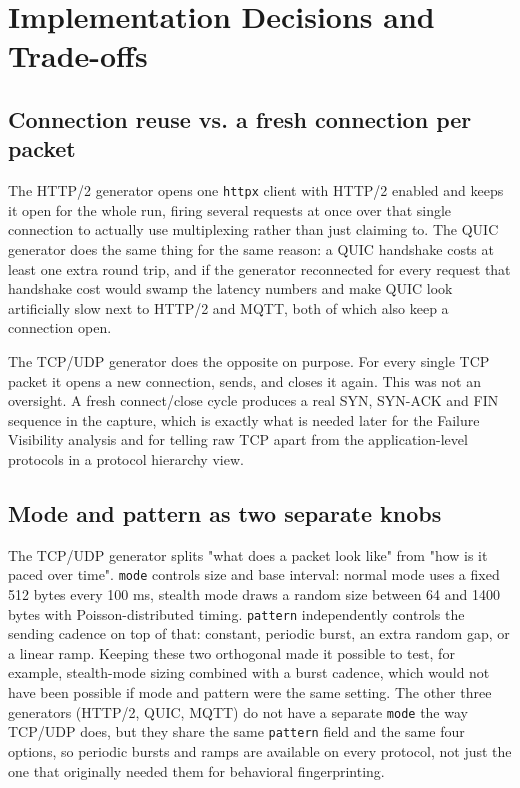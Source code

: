 \section{Implementation Decisions and Trade-offs}

\subsection{Connection reuse vs. a fresh connection per packet}

The HTTP/2 generator opens one \texttt{httpx} client with HTTP/2 enabled and
keeps it open for the whole run, firing several requests at once over that
single connection to actually use multiplexing rather than just claiming to.
The QUIC generator does the same thing for the same reason: a QUIC handshake
costs at least one extra round trip, and if the generator reconnected for
every request that handshake cost would swamp the latency numbers and make
QUIC look artificially slow next to HTTP/2 and MQTT, both of which also keep a
connection open.

The TCP/UDP generator does the opposite on purpose. For every single TCP
packet it opens a new connection, sends, and closes it again. This was not an
oversight. A fresh connect/close cycle produces a real SYN, SYN-ACK and FIN
sequence in the capture, which is exactly what is needed later for the
Failure Visibility analysis and for telling raw TCP apart from the
application-level protocols in a protocol hierarchy view.

\subsection{Mode and pattern as two separate knobs}

The TCP/UDP generator splits "what does a packet look like" from "how is it
paced over time". \texttt{mode} controls size and base interval: normal mode
uses a fixed 512 bytes every 100 ms, stealth mode draws a random size between
64 and 1400 bytes with Poisson-distributed timing. \texttt{pattern}
independently controls the sending cadence on top of that: constant, periodic
burst, an extra random gap, or a linear ramp. Keeping these two orthogonal
made it possible to test, for example, stealth-mode sizing combined with a
burst cadence, which would not have been possible if mode and pattern were
the same setting. The other three generators (HTTP/2, QUIC, MQTT) do not have
a separate \texttt{mode} the way TCP/UDP does, but they share the same
\texttt{pattern} field and the same four options, so periodic bursts and
ramps are available on every protocol, not just the one that originally
needed them for behavioral fingerprinting.

